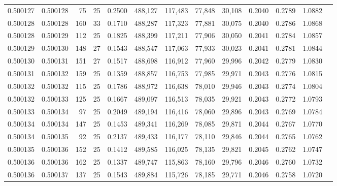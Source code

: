 \begin{tabular}{rrrrrrrrrrrrr}
0.500127 & 0.500128 &  75 &  25 &                                     0.2500 & 488,127 & 117,483 &  77,848 &  30,108 & 0.2040 & 0.2789 & 1.0882 \\
0.500128 & 0.500128 & 160 &  33 &                                     0.1710 & 488,287 & 117,323 &  77,881 &  30,075 & 0.2040 & 0.2786 & 1.0868 \\
0.500128 & 0.500129 & 112 &  25 &                                     0.1825 & 488,399 & 117,211 &  77,906 &  30,050 & 0.2041 & 0.2784 & 1.0857 \\
0.500129 & 0.500130 & 148 &  27 &                                     0.1543 & 488,547 & 117,063 &  77,933 &  30,023 & 0.2041 & 0.2781 & 1.0844 \\
0.500130 & 0.500131 & 151 &  27 &                                     0.1517 & 488,698 & 116,912 &  77,960 &  29,996 & 0.2042 & 0.2779 & 1.0830 \\
0.500131 & 0.500132 & 159 &  25 &                                     0.1359 & 488,857 & 116,753 &  77,985 &  29,971 & 0.2043 & 0.2776 & 1.0815 \\
0.500132 & 0.500132 & 115 &  25 &                                     0.1786 & 488,972 & 116,638 &  78,010 &  29,946 & 0.2043 & 0.2774 & 1.0804 \\
0.500132 & 0.500133 & 125 &  25 &                                     0.1667 & 489,097 & 116,513 &  78,035 &  29,921 & 0.2043 & 0.2772 & 1.0793 \\
0.500133 & 0.500134 &  97 &  25 &                                     0.2049 & 489,194 & 116,416 &  78,060 &  29,896 & 0.2043 & 0.2769 & 1.0784 \\
0.500134 & 0.500134 & 147 &  25 &                                     0.1453 & 489,341 & 116,269 &  78,085 &  29,871 & 0.2044 & 0.2767 & 1.0770 \\
0.500134 & 0.500135 &  92 &  25 &                                     0.2137 & 489,433 & 116,177 &  78,110 &  29,846 & 0.2044 & 0.2765 & 1.0762 \\
0.500135 & 0.500136 & 152 &  25 &                                     0.1412 & 489,585 & 116,025 &  78,135 &  29,821 & 0.2045 & 0.2762 & 1.0747 \\
0.500136 & 0.500136 & 162 &  25 &                                     0.1337 & 489,747 & 115,863 &  78,160 &  29,796 & 0.2046 & 0.2760 & 1.0732 \\
0.500136 & 0.500137 & 137 &  25 &                                     0.1543 & 489,884 & 115,726 &  78,185 &  29,771 & 0.2046 & 0.2758 & 1.0720 \\

\end{tabular}
